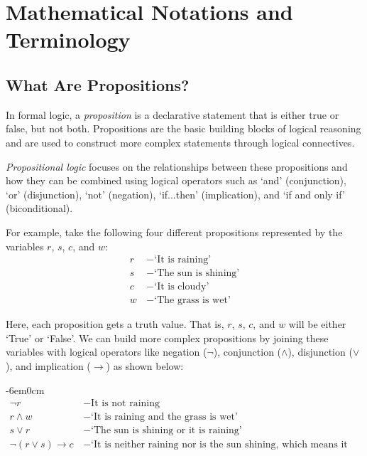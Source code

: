 \documentclass[a4paper, twoside]{article}
\newcommand{\rarrow}{\rightarrow}
\begin{document}
\newpage

\section{Mathematical Notations and Terminology}
\subsection{What Are Propositions?}
In formal logic, a \textit{proposition} is a declarative statement that is either true or false, but not both. Propositions are the basic building blocks of logical reasoning and are used to construct more complex statements through logical connectives.

\textit{Propositional logic} focuses on the relationships between these propositions and how they can be combined using logical operators such as `and' (conjunction), `or' (disjunction), `not' (negation), `if...then' (implication), and `if and only if' (biconditional).



For example, take the following four different propositions represented by the variables \(r\), \(s\), \(c\), and \(w\):
\vspace{-0.5em}
\begin{align*}
    r\, &- \text{`It is raining'}\\
    s\, &- \text{`The sun is shining'}\\
    c\, &- \text{`It is cloudy'}\\
    w\, &- \text{`The grass is wet'}
\end{align*}

Here, each proposition gets a truth value. That is, \(r\), \(s\), \(c\), and \(w\) will be either `True' or `False'. We can build more complex propositions by joining these variables with logical operators like negation (\( \neg \)), conjunction (\(\land\)), disjunction (\(\lor\)), and implication (\(\rarrow\)) as shown below:
\vspace{-2.5em}
\begin{adjustwidth}{-6em}{0cm}
    \begin{align*}
        \neg r\, &- \text{It is not raining}\\
        r \land w\, &- \text{`It is raining and the grass is wet'}\\
        s \lor r\, &- \text{`The sun is shining or it is raining'}\\
        \neg (r \lor s) \rarrow c\, &- \text{`It is neither raining nor is the sun shining, which means it must be cloudy'}
    \end{align*}
\end{adjustwidth}
\end{document}
